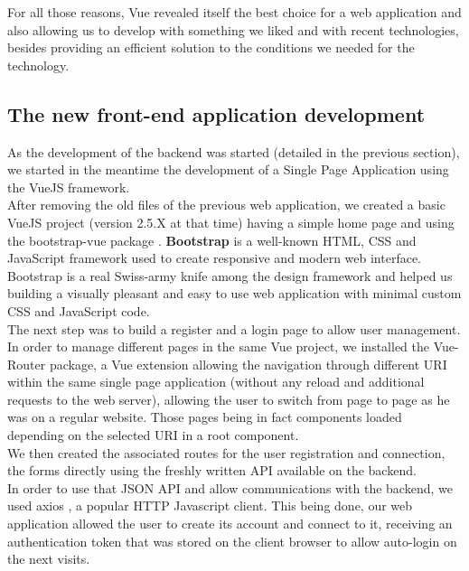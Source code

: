 \documentclass{eplmastersthesis}
\begin{document}
        For all those reasons, Vue revealed itself the best choice for a
        web application and also allowing us to develop with something
        we liked and with recent technologies, besides providing an efficient
        solution to the conditions we needed for the technology.

      \subsection{The new front-end application development}

        As the development of the backend was started (detailed in the
        previous section), we started in the meantime the development of a
        Single Page Application using the VueJS framework.\\

        After removing the old files of the previous web application, we
        created a basic VueJS project (version 2.5.X at that time) having a
        simple home page and using the bootstrap-vue package
        \cite{BootstrapVue}. \textbf{Bootstrap} \cite{Bootstrap} is a
        well-known HTML, CSS and JavaScript framework used to create responsive
        and modern web interface.\\
        Bootstrap is a real Swiss-army knife among the design framework
        and helped us building a visually pleasant and easy to use
        web application with minimal custom CSS and JavaScript code.\\

        The next step was to build a register and a login page to allow
        user management. In order to manage different pages in the same Vue
        project, we installed the Vue-Router package, a Vue extension
        allowing the navigation through different URI within the same
        single page application (without any reload and additional requests
        to the web server), allowing the user to switch from page to page
        as he was on a regular website. Those pages being in fact components
        loaded depending on the selected URI in a root component.\\
        We then created the associated routes for the user registration and
        connection, the forms directly using the freshly written API available
        on the backend.\\
        In order to use that JSON API and allow communications with the
        backend, we used axios \cite{axios}, a popular HTTP Javascript client.
        This being done, our web application allowed the user to create its
        account and connect to it, receiving an authentication token that
        was stored on the client browser to allow auto-login on the next
        visits.\\
\end{document}
